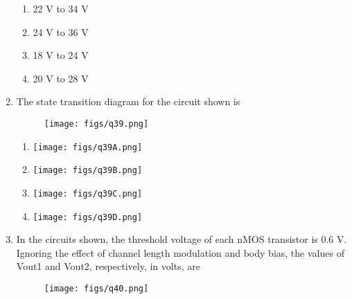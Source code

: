 \documentclass[a4paper, 11pt]{article}
\begin{document}
\begin{enumerate}
    \begin{enumerate}
        \item 22 V to 34 V
        \item 24 V to 36 V
        \item 18 V to 24 V
        \item 20 V to 28 V
    \end{enumerate}

    \hfill{}
    
    \item The state transition diagram for the circuit shown is
    
    \begin{figure}[H]
        \centering
        \texttt{[image: figs/q39.png]}
        \caption*{}
        \label{fig:q39}
    \end{figure}
    
    \begin{enumerate}
            \item \texttt{[image: figs/q39A.png]}
            \item \texttt{[image: figs/q39B.png]}
            \item \texttt{[image: figs/q39C.png]}
            \item \texttt{[image: figs/q39D.png]}
        
    \end{enumerate}

    \hfill{}
    
    \item In the circuits shown, the threshold voltage of each nMOS transistor is 0.6 V. Ignoring the effect of channel length modulation and body bias, the values of Vout1 and Vout2, respectively, in volts, are
    
    \begin{figure}[H]
        \centering
        \texttt{[image: figs/q40.png]}
        \caption*{}
        \label{fig:q40}
    \end{figure}
    
    \begin{enumerate}
    \end{enumerate}
    

\end{enumerate}
\end{document}
